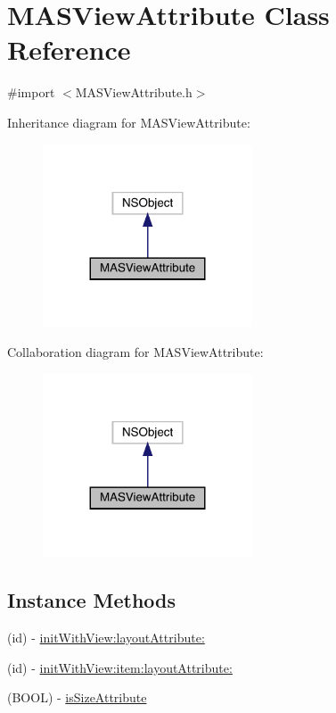 \hypertarget{interface_m_a_s_view_attribute}{}\section{M\+A\+S\+View\+Attribute Class Reference}
\label{interface_m_a_s_view_attribute}


{\ttfamily \#import $<$M\+A\+S\+View\+Attribute.\+h$>$}



Inheritance diagram for M\+A\+S\+View\+Attribute\+:\nopagebreak
\begin{figure}[H]
\begin{center}
\leavevmode
\includegraphics[width=176pt]{interface_m_a_s_view_attribute__inherit__graph}
\end{center}
\end{figure}


Collaboration diagram for M\+A\+S\+View\+Attribute\+:\nopagebreak
\begin{figure}[H]
\begin{center}
\leavevmode
\includegraphics[width=176pt]{interface_m_a_s_view_attribute__coll__graph}
\end{center}
\end{figure}
\subsection*{Instance Methods}
\begin{DoxyCompactItemize}
\item 
(id) -\/ \mbox{\hyperlink{interface_m_a_s_view_attribute_ad8c7fbb0e68f781ffd498acd8618bece}{init\+With\+View\+:layout\+Attribute\+:}}
\item 
(id) -\/ \mbox{\hyperlink{interface_m_a_s_view_attribute_a14cf8e6b32be1710115a9248aceb3b85}{init\+With\+View\+:item\+:layout\+Attribute\+:}}
\item 
(B\+O\+OL) -\/ \mbox{\hyperlink{interface_m_a_s_view_attribute_aef0254d02a5de6de517372e56453bc69}{is\+Size\+Attribute}}
\end{DoxyCompactItemize}
